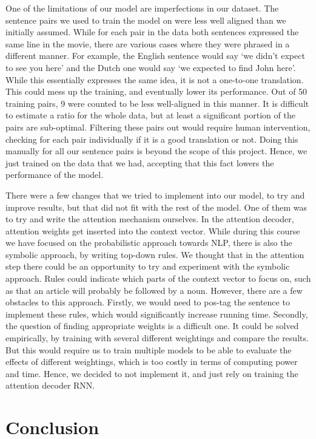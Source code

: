 \documentclass[11pt]{article}
\begin{document}
One of the limitations of our model are imperfections in our dataset. The sentence pairs we used to train the model on were less well aligned than we initially assumed. While for each pair in the data both sentences expressed the same line in the movie, there are various cases where they were phrased in a different manner. For example, the English sentence would say ‘we didn’t expect to see you here’ and the Dutch one would say ‘we expected to find John here’. While this essentially expresses the same idea, it is not a one-to-one translation. This could mess up the training, and eventually lower its performance. Out of 50 training pairs, 9 were counted to be less well-aligned in this manner. It is difficult to estimate a ratio for the whole data, but at least a significant portion of the pairs are sub-optimal. Filtering these pairs out would require human intervention, checking for each pair individually if it is a good translation or not. Doing this manually for all our sentence pairs is beyond the scope of this project. Hence, we just trained on the data that we had, accepting that this fact lowers the performance of the model.

There were a few changes that we tried to implement into our model, to try and improve results, but that did not fit with the rest of the model. One of them was to try and write the attention mechanism ourselves. In the attention decoder, attention weights get inserted into the context vector. While during this course we have focused on the probabilistic approach towards NLP, there is also the symbolic approach, by writing top-down rules. We thought that in the attention step there could be an opportunity to try and experiment with the symbolic approach. Rules could indicate which parts of the context vector to focus on, such as that an article will probably be followed by a noun. However, there are a few obstacles to this approach. Firstly, we would need to pos-tag the sentence to implement these rules, which would significantly increase running time. Secondly, the question of finding appropriate weights is a difficult one. It could be solved empirically, by training with several different weightings and compare the results. But this would require us to train multiple models to be able to evaluate the effects of different weightings, which is too costly in terms of computing power and time. Hence, we decided to not implement it, and just rely on training the attention decoder RNN.

\section{Conclusion}
\end{document}
